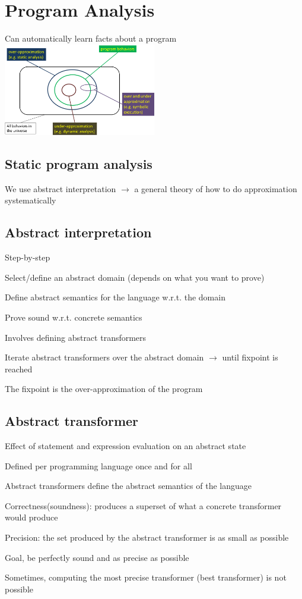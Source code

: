 \section{Program Analysis}
\enumstart
	\item Can automatically learn facts about a program
	\\ \includegraphics[width=0.5\textwidth]{img/program_analysis.png}
\enumend

\subsection{Static program analysis}
\enumstart
	\item We use abstract interpretation $\rightarrow$ a general theory of how to do approximation systematically
\enumend

\subsection{Abstract interpretation}
\enumstart
	\item Step-by-step
	\enumstart
		\item Select/define an abstract domain (depends on what you want to prove)
		\item Define abstract semantics for the language w.r.t. the domain
		\enumstart
			\item Prove sound w.r.t. concrete semantics
			\item Involves defining abstract transformers
		\enumend
		\item Iterate abstract transformers over the abstract domain $\rightarrow$ until fixpoint is reached
	\enumend
	\item The fixpoint is the over-approximation of the program
\enumend

\subsection{Abstract transformer}
\enumstart
	\item Effect of statement and expression evaluation on an abstract state
	\item Defined per programming language once and for all
	\item Abstract transformers define the abstract semantics of the language
	\item Correctness(soundness): produces a superset of what a concrete transformer would produce
	\item Precision: the set produced by the abstract transformer is as small as possible
	\item Goal, be perfectly sound and as precise as possible
	\item Sometimes, computing the most precise transformer (best transformer) is not possible
\enumend

